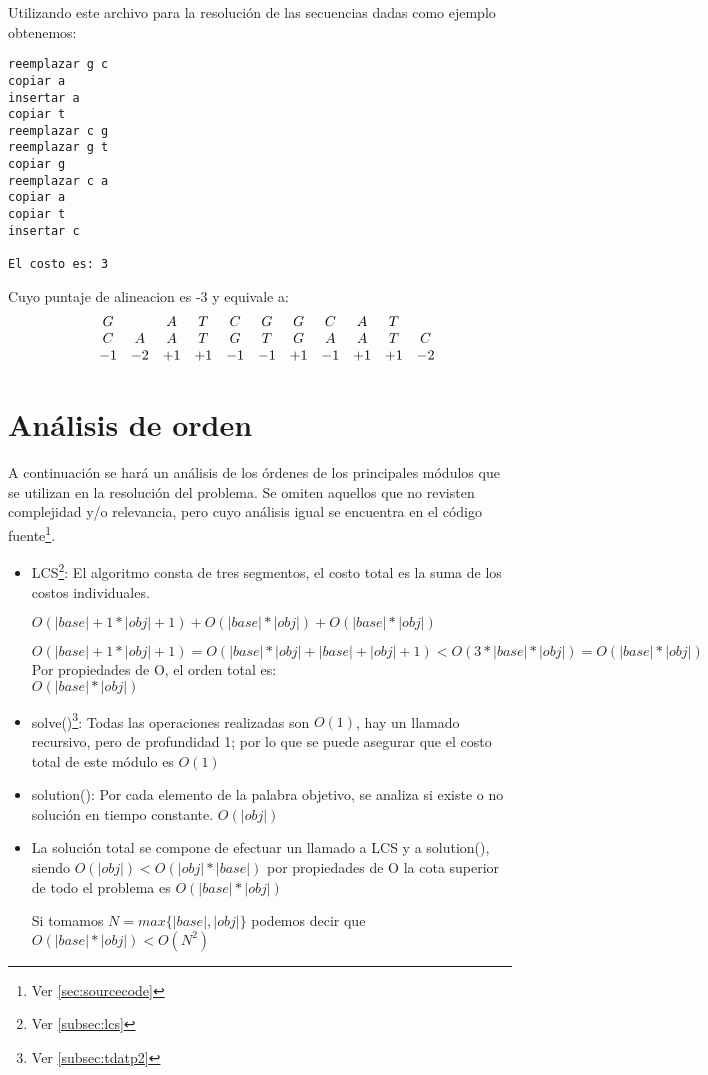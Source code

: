 \documentclass[12pt]{article}
\begin{document}
Utilizando este archivo para la resolución de las secuencias dadas como
ejemplo obtenemos:
\begin{lstlisting}
reemplazar g c
copiar a
insertar a
copiar t
reemplazar c g
reemplazar g t
copiar g
reemplazar c a
copiar a
copiar t
insertar c

El costo es: 3
\end{lstlisting}
Cuyo puntaje de alineacion es -3 y equivale a:
\[
\begin{array}{ccccccccccccc}
  &G &\space &A &T &C &G &G &C &A &T &\space  \\
  &C &A &A &T &G &T &G &A &A &T &C	\\
  &-1 &-2 &+1 &+1 &-1 &-1 &+1 &-1 &+1 &+1 &-2
\end{array}
\]

\newpage
\section{Análisis de orden}
A continuación se hará un análisis de los órdenes de los principales
módulos que se utilizan en la resolución del problema. Se omiten aquellos
que no revisten complejidad y/o relevancia, pero cuyo análisis igual se
encuentra en el código fuente\footnote{Ver \ref{sec:sourcecode}}.

\begin{itemize}
	\item LCS\footnote{Ver \ref{subsec:lcs}}: El algoritmo consta
	de tres segmentos, el costo total es la suma de los costos individuales.
	
	$O(|base|+1 * |obj|+1)+O(|base|*|obj|)+O(|base|*|obj|)$
	
	$O(|base|+1 * |obj|+1)=O(|base|*|obj|+|base|+|obj|+1)<O(3*|base|*|obj|)=O(|base|*|obj|)$
	\\Por propiedades de O, el orden total es:
	\\$O(|base|*|obj|)$
	
	\item solve()\footnote{\label{pie1}Ver \ref{subsec:tdatp2}}: Todas las operaciones realizadas son $O(1)$, hay un llamado
	recursivo, pero de profundidad 1; por lo que se puede asegurar que el 
	costo total de este módulo es $O(1)$
	
	\item solution(): Por cada elemento de la palabra objetivo, se analiza
	si existe o no solución en tiempo constante. $O(|obj|)$
	
	\item La solución total se compone de efectuar un llamado a LCS y a 
	solution(), siendo $O(|obj|)<O(|obj|*|base|)$ por propiedades de O
	la cota superior de todo el problema es $O(|base|*|obj|)$
	
	Si tomamos $N=max\{|base|,|obj|\}$ podemos decir que $O(|base|*|obj|)<O(N^{2})$
\end{itemize}
\end{document}

